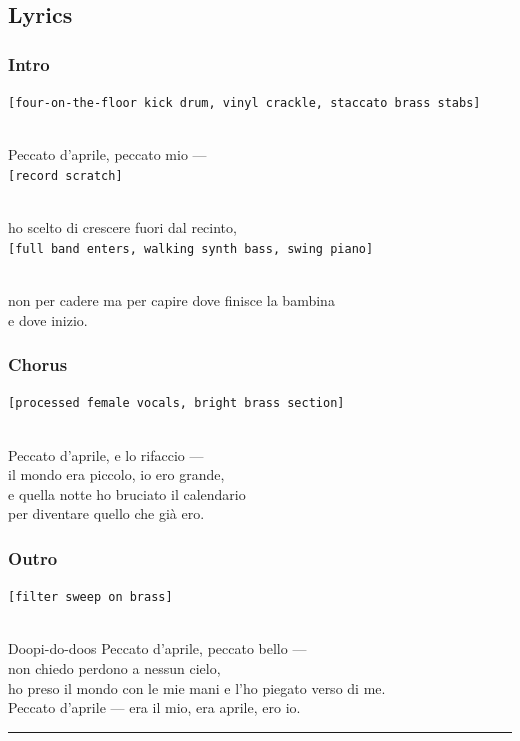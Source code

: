 \documentclass[]{article}
\begin{document}
\subsection{Lyrics}\label{lyrics-14}

\subsubsection{Intro}\label{intro-5}

\texttt{{[}four-on-the-floor\ kick\ drum,\ vinyl\ crackle,\ staccato\ brass\ stabs{]}}\strut \\
Peccato d'aprile, peccato mio ---\\
\texttt{{[}record\ scratch{]}}\strut \\
ho scelto di crescere fuori dal recinto,\\
\texttt{{[}full\ band\ enters,\ walking\ synth\ bass,\ swing\ piano{]}}\strut \\
non per cadere ma per capire dove finisce la bambina\\
e dove inizio.

\subsubsection{Chorus}\label{chorus-20}

\texttt{{[}processed\ female\ vocals,\ bright\ brass\ section{]}}\strut \\
Peccato d'aprile, e lo rifaccio ---\\
il mondo era piccolo, io ero grande,\\
e quella notte ho bruciato il calendario\\
per diventare quello che già ero.

\subsubsection{Outro}\label{outro-1}

\texttt{{[}filter\ sweep\ on\ brass{]}}\strut \\
Doopi-do-doos Peccato d'aprile, peccato bello ---\\
non chiedo perdono a nessun cielo,\\
ho preso il mondo con le mie mani e l'ho piegato verso di me.\\
Peccato d'aprile --- era il mio, era aprile, ero io.

\begin{center}\rule{0.5\linewidth}{0.5pt}\end{center}
\end{document}
